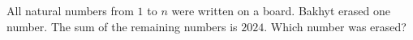All natural numbers from $1$ to $n$ were written on a board. Bakhyt erased one number. The sum of the remaining numbers is $2024$. Which number was erased?

